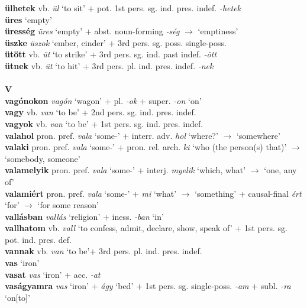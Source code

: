 \documentclass[11pt]{article}
\begin{document}
\textbf{ülhetek} vb. \emph{ül}
`to sit' + pot. 1st pers. sg. ind. pres. indef. \emph{-hetek} \\
\textbf{üres} `empty' \\
\textbf{üresség} \emph{üres} `empty' +
abst. noun\hyp{}forming \emph{-ség} $\rightarrow$ `emptiness' \\
\textbf{üszke} \emph{üszok} `ember, cinder' + 3rd
pers. sg. poss. single\hyp{}poss. \\
\textbf{ütött} vb. \emph{üt} `to strike' + 3rd pers. sg. ind. past
indef. \emph{-ött} \\
\textbf{ütnek} vb. \emph{üt} `to hit' + 3rd
pers. pl. ind. pres. indef. \emph{-nek} \\
\ \\
\noindent \textbf{\large V} \\
\textbf{vagónokon} \emph{vagón} `wagon' + pl. \emph{-ok} +
super. \emph{-on} `on' \\
\textbf{vagy} vb. \emph{van} `to be' + 2nd
pers. sg. ind. pres. indef. \\
\textbf{vagyok} vb. \emph{van} `to be' + 1st
pers. sg. ind. pres. indef. \\
\textbf{valahol} pron. pref. \emph{vala} `some-' + interr. adv. \emph{hol} `where?' $\rightarrow$ `somewhere' \\
\textbf{valaki} pron. pref. \emph{vala} `some-' +
pron. rel. arch. \emph{ki} `who (the person(s) that)' $\rightarrow$
`somebody, someone' \\
\textbf{valamelyik} pron. pref. \emph{vala} `some-' +
    interj. \emph{myelik} `which, what' $\rightarrow$ `one, any of' \\
\textbf{valamiért} pron. pref. \emph{vala} `some-' + \emph{mi} `what' $\rightarrow$ `something' +
causal\hyp{}final \emph{ért} `for' $\rightarrow$ `for some reason' \\
\textbf{vallásban} \emph{vallás} `religion' + iness. \emph{-ban}
`in' \\
\textbf{vallhatom} vb. \emph{vall} `to confess, admit, declare, show,
speak of' + 1st pers. sg. pot. ind. pres. def. \\
\textbf{vannak} vb. \emph{van} `to be'+ 3rd
pers. pl. ind. pres. indef. \\
\textbf{vas} `iron' \\
\textbf{vasat} \emph{vas} `iron' + acc. \emph{-at} \\
\textbf{vaságyamra} \emph{vas} `iron' + \emph{ágy} `bed' + 1st
pers. sg. single\hyp{}poss. \emph{-am} + subl. \emph{-ra} `on[to]' \\
\end{document}
